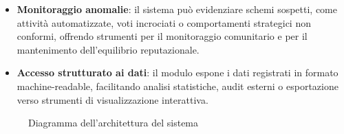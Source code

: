 \begin{itemize}
                \item \textbf{Monitoraggio anomalie}: il sistema può evidenziare schemi sospetti, come attività automatizzate, voti incrociati o comportamenti strategici non conformi, offrendo strumenti per il monitoraggio comunitario e per il mantenimento dell'equilibrio reputazionale.
            
                \item \textbf{Accesso strutturato ai dati}: il modulo espone i dati registrati in formato machine-readable, facilitando analisi statistiche, audit esterni o esportazione verso strumenti di visualizzazione interattiva.
            \end{itemize}

    \begin{figure}[H]
        
        \caption{Diagramma dell'architettura del sistema}
        \label{fig:architettura}
    \end{figure}
    
